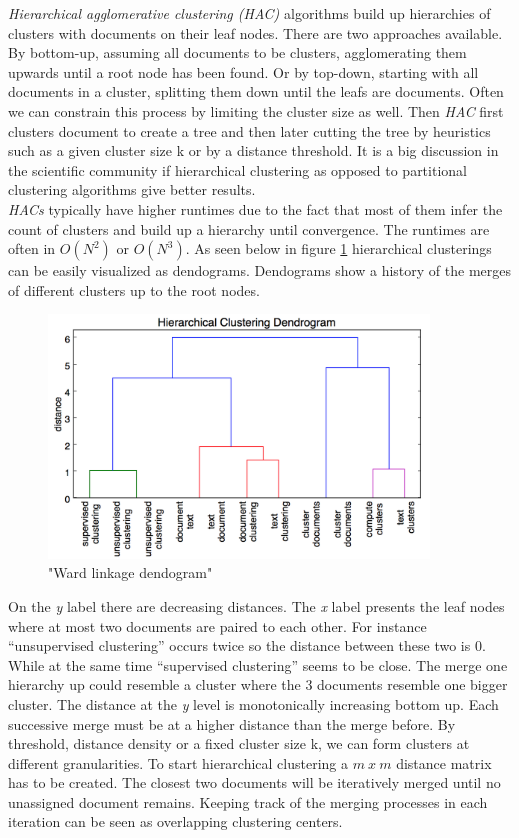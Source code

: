     \emph{Hierarchical agglomerative clustering (HAC)} algorithms build up hierarchies of clusters with  documents on their leaf nodes. There are two approaches available. By bottom-up, assuming all documents to be clusters, agglomerating them upwards until a root node has been found. Or by top-down, starting with all documents in a cluster, splitting them down until the leafs are documents. Often we can constrain this process by limiting the cluster size as well. Then \emph{HAC} first clusters document to create a tree and then later cutting the tree by heuristics such as a given cluster size k or by a distance threshold. It is a big discussion in the scientific community if hierarchical clustering as opposed to partitional clustering algorithms give better results. \cite[chp. 17]{IRBook2008}\\
    \emph{HACs} typically have higher runtimes due to the fact that most of them infer the count of clusters and build up a hierarchy until convergence. The runtimes are often in $O(N^2)$ or $O(N^3)$. As seen below in figure \ref{hac_dendogram} hierarchical clusterings can be easily visualized as dendograms. Dendograms show a history of the merges of different clusters up to the root nodes.

    \begin{figure}[h!]
      \centering
        \includegraphics[width=0.9\textwidth]{dendogram.png}
        \caption{"Ward linkage dendogram"}
        \label{hac_dendogram}
    \end{figure}

    On the \emph{y} label there are decreasing distances. The \emph{x} label presents the leaf nodes where at most two documents are paired to each other. For instance ``unsupervised clustering'' occurs twice so the distance between these two is 0. While at the same time ``supervised clustering'' seems to be close. The merge one hierarchy up could resemble a cluster where the 3 documents resemble one bigger cluster. The distance at the \emph{y} level is monotonically increasing bottom up. Each successive merge must be at a higher distance than the merge before. By threshold, distance density or a fixed cluster size k, we can form clusters at different granularities. To start hierarchical clustering a $m\:x\:m$ distance matrix has to be created. The closest two documents will be iteratively merged until no unassigned document remains. Keeping track of the merging processes in each iteration can be seen as overlapping clustering centers.\\

